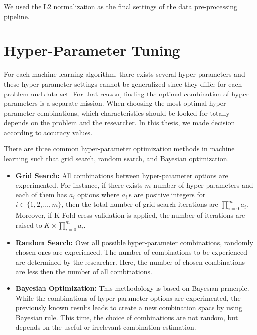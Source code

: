 We used the L2 normalization as the final settings of the data pre-processing pipeline.

\section{Hyper-Parameter Tuning}

For each machine learning algorithm, there exists several hyper-parameters and these hyper-parameter settings cannot be generalized since they differ for each problem and data set. For that reason, finding the optimal combination of hyper-parameters is a separate mission. When choosing the most optimal hyper-parameter combinations, which characteristics should be looked for totally depends on the problem and the researcher. In this thesis, we made decision according to accuracy values.

There are three common hyper-parameter optimization methods in machine learning such that grid search, random search, and Bayesian optimization.

\begin{itemize}
    
    \item \textbf{Grid Search:} All combinations between hyper-parameter options are experimented. For instance, if there exists $m$ number of hyper-parameters and each of them has $a_{i}$ options where $a_{i}$'s are positive integers for $i \in \{1,2,\dots,m\}$, then the total number of grid search iterations are $\prod_{i=0}^{m} a_{i}$. Moreover, if K-Fold cross validation is applied, the number of iterations are raised to $K \times \prod_{i=0}^{m} a_{i}$.
    
    \item \textbf{Random Search:} Over all possible hyper-parameter combinations, randomly chosen ones are experienced. The number of combinations to be experienced are determined by the researcher. Here, the number of chosen combinations are less then the number of all combinations.
    
    \item \textbf{Bayesian Optimization:} This methodology is based on Bayesian principle. While the combinations of hyper-parameter options are experimented, the previously known results leads to create a new combination space by using Bayesian rule. This time, the choice of combinations are not random, but depends on the useful or irrelevant combination estimation.
    
\end{itemize}

